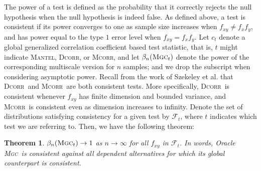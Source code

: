 \documentclass[11pt]{article}
\providecommand{\sct}[1]{{\normalfont\textsc{#1}}}
\providecommand{\mc}[1]{\mathcal{#1}}
\newcommand{\G}{c}
\newcommand{\Mgc}{\sct{Mgc}}
\newcommand{\Dcorr}{\sct{Dcorr}}
\newcommand{\Mcorr}{\sct{Mcorr}}
\newcommand{\Mantel}{\sct{Mantel}}
\newtheorem{thm}{Theorem}
\begin{document}
The power of a test is defined as the probability that it correctly rejects the null hypothesis when the null hypothesis is indeed false.
As defined above, a test is consistent if its power converges to one as sample size increases when $f_{xy} \neq f_x f_y$, and has power equal to the type $1$ error level when $f_{xy}=f_x f_y$.
Let $\G_t$ denote a global generalized correlation coefficient based test statistic, that is, $t$ might indicate \Mantel, \Dcorr, or \Mcorr, and let $\beta_n(\Mgc_t)$ denote the power of the corresponding multiscale version for $n$ samples; and we drop the subscript when considering asymptotic power.
Recall from the work of Szekeley et al. that \Dcorr~and \Mcorr~are both consistent tests. More specifically, \Dcorr~is consistent whenever $f_{xy}$ has finite dimension and bounded variance, and \Mcorr~is consistent even as dimension increases to infinity.  Denote the set of distributions satisfying consistency for a given test by $\mc{F}_t$, where $t$ indicates which test we are referring to. Then, we have the following theorem:
\begin{thm}
\label{thm1}
$\beta_n(\Mgc_t) \rightarrow 1$ as $n \to \infty$ for all $f_{xy}$ in $\mc{F}_t$.
In words, Oracle \Mgc~is consistent against all dependent alternatives for which its global counterpart is consistent. 
%
%
%
\end{thm}
\end{document}
